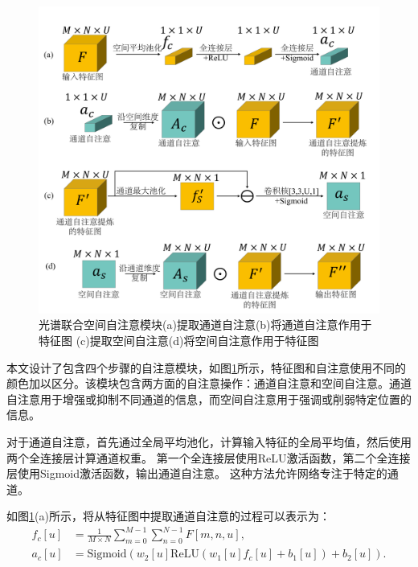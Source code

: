 \documentclass[
    type = master, %
    degree = academic,        %
    decl-page,  %
  ]{njuthesis}
\begin{document}
\begin{figure}[h]
	\begin{center}
		\includegraphics[width=1.0\linewidth]{docs/fig-chap2/fig-2-attention.pdf}
	\end{center}
	\caption{光谱联合空间自注意模块\quad (a)提取通道自注意\quad (b)将通道自注意作用于特征图 \quad (c)提取空间自注意\quad (d)将空间自注意作用于特征图}
	\label{fig:attentionn}
\end{figure}

本文设计了包含四个步骤的自注意模块，如图\ref{fig:attentionn}所示，特征图和自注意使用不同的颜色加以区分。该模块包含两方面的自注意操作：通道自注意和空间自注意。通道自注意用于增强或抑制不同通道的信息，而空间自注意用于强调或削弱特定位置的信息。

对于通道自注意，首先通过全局平均池化，计算输入特征的全局平均值，然后使用两个全连接层计算通道权重。 第一个全连接层使用ReLU激活函数，第二个全连接层使用Sigmoid激活函数，输出通道自注意。 这种方法允许网络专注于特定的通道。

如图\ref{fig:attentionn}(a)所示，将从特征图中提取通道自注意的过程可以表示为：
\begin{equation}
    \begin{align}
        f_c[u] &= \frac{1}{M \times N} \sum_{m=0}^{M-1} \sum_{n=0}^{N-1} F[m,n,u],\\
        a_c[u] &= \text{Sigmoid}(w_2[u]\text{ReLU}(w_1[u]f_c[u] + b_1[u])+b_2[u]).
    \end{align}
\end{equation}
\end{document}
